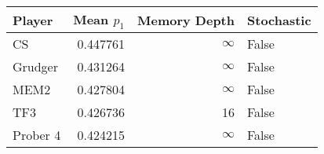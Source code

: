 \begin{tabular}{lrrl}
\toprule
   Player &  Mean $p_1$ &  Memory Depth & Stochastic \\
\midrule
       CS &    0.447761 &            \(\infty\) &      False \\
  Grudger &    0.431264 &            \(\infty\) &      False \\
     MEM2 &    0.427804 &            \(\infty\) &      False \\
      TF3 &    0.426736 &            16 &      False \\
 Prober 4 &    0.424215 &            \(\infty\) &      False \\
\bottomrule
\end{tabular}
